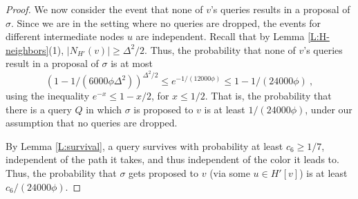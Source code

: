 \begin{proof}
We now consider the event that none of $v$'s queries results in a proposal of $\sigma$. Since we are in the setting where no queries are dropped, 
the events for different intermediate nodes $u$ are independent.
Recall that by Lemma \ref{L:H-neighbors}(1), $|N_{H'}(v)| \ge \Delta^2/2$.
Thus, the probability that none of $v$'s queries result in a proposal of $\sigma$ is at most
\[ (1-1/(6000\phi\Delta^2))^{\Delta^2/2} \le  e^{-1/(12000\phi)} \le 1-1/(24000\phi)\ , \]
using the inequality $e^{-x} \le 1-x/2$, for $x \le 1/2$.
That is, the probability that there is a query $Q$ in which $\sigma$ is proposed to $v$ is at least $1/(24000\phi)$, under our assumption that no queries are dropped.

By Lemma \ref{L:survival}, a query survives with probability at least $c_6 \ge 1/7$, independent of the path it takes, and thus independent of the color it leads to.
Thus, the probability that $\sigma$ gets proposed to $v$ (via some $u \in H'[v]$) is at least 
$c_6/(24000\phi)$.
\end{proof}

